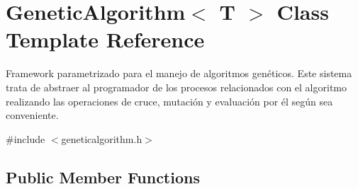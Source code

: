 \hypertarget{class_genetic_algorithm}{}\section{Genetic\+Algorithm$<$ T $>$ Class Template Reference}
\label{class_genetic_algorithm}


Framework parametrizado para el manejo de algoritmos genéticos. Este sistema trata de abstraer al programador de los procesos relacionados con el algoritmo realizando las operaciones de cruce, mutación y evaluación por él según sea conveniente.  




{\ttfamily \#include $<$geneticalgorithm.\+h$>$}

\subsection*{Public Member Functions}
